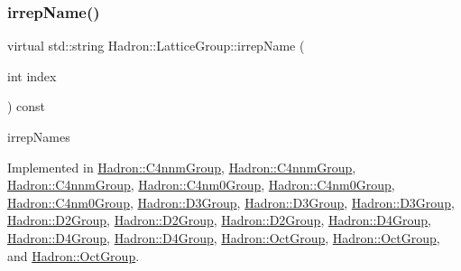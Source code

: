 \subsubsection{\texorpdfstring{irrepName()}{irrepName()}\hspace{0.1cm}{\footnotesize\ttfamily [2/3]}}
{\footnotesize\ttfamily virtual std\+::string Hadron\+::\+Lattice\+Group\+::irrep\+Name (\begin{DoxyParamCaption}\item[{int}]{index }\end{DoxyParamCaption}) const\hspace{0.3cm}{\ttfamily [pure virtual]}}

irrep\+Names 

Implemented in \mbox{\hyperlink{structHadron_1_1C4nnmGroup_ac2b3ee6989ddbd93bc63c46ac9626997}{Hadron\+::\+C4nnm\+Group}}, \mbox{\hyperlink{structHadron_1_1C4nnmGroup_ac2b3ee6989ddbd93bc63c46ac9626997}{Hadron\+::\+C4nnm\+Group}}, \mbox{\hyperlink{structHadron_1_1C4nnmGroup_ac2b3ee6989ddbd93bc63c46ac9626997}{Hadron\+::\+C4nnm\+Group}}, \mbox{\hyperlink{structHadron_1_1C4nm0Group_ae7e7c420d17cacaed69a74902af72dcc}{Hadron\+::\+C4nm0\+Group}}, \mbox{\hyperlink{structHadron_1_1C4nm0Group_ae7e7c420d17cacaed69a74902af72dcc}{Hadron\+::\+C4nm0\+Group}}, \mbox{\hyperlink{structHadron_1_1C4nm0Group_ae7e7c420d17cacaed69a74902af72dcc}{Hadron\+::\+C4nm0\+Group}}, \mbox{\hyperlink{structHadron_1_1D3Group_a3e60ca3001ddc0176179107cfed2d621}{Hadron\+::\+D3\+Group}}, \mbox{\hyperlink{structHadron_1_1D3Group_a3e60ca3001ddc0176179107cfed2d621}{Hadron\+::\+D3\+Group}}, \mbox{\hyperlink{structHadron_1_1D3Group_a3e60ca3001ddc0176179107cfed2d621}{Hadron\+::\+D3\+Group}}, \mbox{\hyperlink{structHadron_1_1D2Group_a502111e32a238c50b248b9f7b0625385}{Hadron\+::\+D2\+Group}}, \mbox{\hyperlink{structHadron_1_1D2Group_a502111e32a238c50b248b9f7b0625385}{Hadron\+::\+D2\+Group}}, \mbox{\hyperlink{structHadron_1_1D2Group_a502111e32a238c50b248b9f7b0625385}{Hadron\+::\+D2\+Group}}, \mbox{\hyperlink{structHadron_1_1D4Group_a5f121bd08a7add3ddf660c7e3478cb9e}{Hadron\+::\+D4\+Group}}, \mbox{\hyperlink{structHadron_1_1D4Group_a5f121bd08a7add3ddf660c7e3478cb9e}{Hadron\+::\+D4\+Group}}, \mbox{\hyperlink{structHadron_1_1D4Group_a5f121bd08a7add3ddf660c7e3478cb9e}{Hadron\+::\+D4\+Group}}, \mbox{\hyperlink{structHadron_1_1OctGroup_a58f84ff32d1dce2277f3b9da9d35d594}{Hadron\+::\+Oct\+Group}}, \mbox{\hyperlink{structHadron_1_1OctGroup_a58f84ff32d1dce2277f3b9da9d35d594}{Hadron\+::\+Oct\+Group}}, and \mbox{\hyperlink{structHadron_1_1OctGroup_a58f84ff32d1dce2277f3b9da9d35d594}{Hadron\+::\+Oct\+Group}}.

